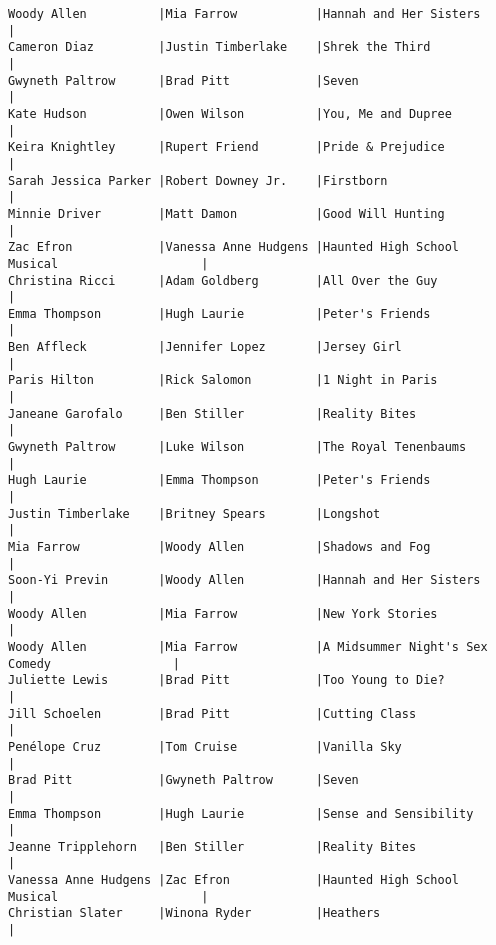 \documentclass{article}
\begin{document}
\begin{verbatim}
Woody Allen          |Mia Farrow           |Hannah and Her Sisters                         |
Cameron Diaz         |Justin Timberlake    |Shrek the Third                                |
Gwyneth Paltrow      |Brad Pitt            |Seven                                          |
Kate Hudson          |Owen Wilson          |You, Me and Dupree                             |
Keira Knightley      |Rupert Friend        |Pride & Prejudice                              |
Sarah Jessica Parker |Robert Downey Jr.    |Firstborn                                      |
Minnie Driver        |Matt Damon           |Good Will Hunting                              |
Zac Efron            |Vanessa Anne Hudgens |Haunted High School Musical                    |
Christina Ricci      |Adam Goldberg        |All Over the Guy                               |
Emma Thompson        |Hugh Laurie          |Peter's Friends                                |
Ben Affleck          |Jennifer Lopez       |Jersey Girl                                    |
Paris Hilton         |Rick Salomon         |1 Night in Paris                               |
Janeane Garofalo     |Ben Stiller          |Reality Bites                                  |
Gwyneth Paltrow      |Luke Wilson          |The Royal Tenenbaums                           |
Hugh Laurie          |Emma Thompson        |Peter's Friends                                |
Justin Timberlake    |Britney Spears       |Longshot                                       |
Mia Farrow           |Woody Allen          |Shadows and Fog                                |
Soon-Yi Previn       |Woody Allen          |Hannah and Her Sisters                         |
Woody Allen          |Mia Farrow           |New York Stories                               |
Woody Allen          |Mia Farrow           |A Midsummer Night's Sex Comedy                 |
Juliette Lewis       |Brad Pitt            |Too Young to Die?                              |
Jill Schoelen        |Brad Pitt            |Cutting Class                                  |
Penélope Cruz        |Tom Cruise           |Vanilla Sky                                    |
Brad Pitt            |Gwyneth Paltrow      |Seven                                          |
Emma Thompson        |Hugh Laurie          |Sense and Sensibility                          |
Jeanne Tripplehorn   |Ben Stiller          |Reality Bites                                  |
Vanessa Anne Hudgens |Zac Efron            |Haunted High School Musical                    |
Christian Slater     |Winona Ryder         |Heathers                                       |

\end{verbatim}
\end{document}
